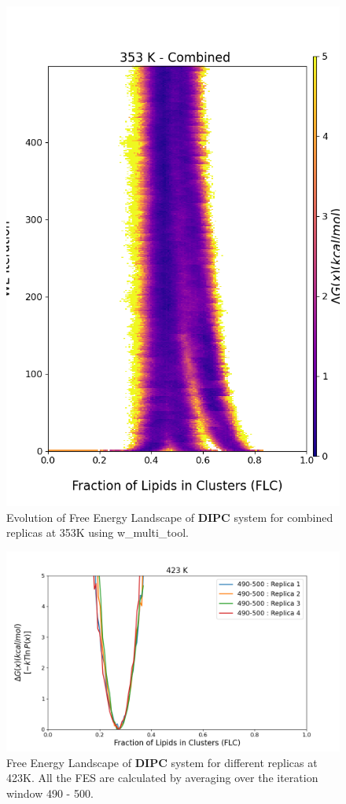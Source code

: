 \documentclass{biophys-new}
\begin{document}
\begin{figure}[hbt!]
\centering
\includegraphics[width=0.8\linewidth]{all_plots/ClusterLipids2Total/DPPC_DIPC_CHOL/353K/Evolution_DIPC_MULTI__353_ClusterLipids2Total.png}
\caption{Evolution of Free Energy Landscape of \textbf{DIPC} system for combined replicas at 353K using w\_multi\_tool.}
\label{fig:view}

\end{figure}


\begin{figure}[hbt!]
\centering
\includegraphics[width=1.1\linewidth]{all_plots/ClusterLipids2Total/DPPC_DIPC_CHOL/423K/Average_DIPC_423_ClusterLipids2Total.png}
\caption{Free Energy Landscape of \textbf{DIPC} system for different replicas at 423K. All the FES are calculated by averaging over the iteration window 490 - 500.}
\label{fig:view}

\end{figure}
\end{document}
